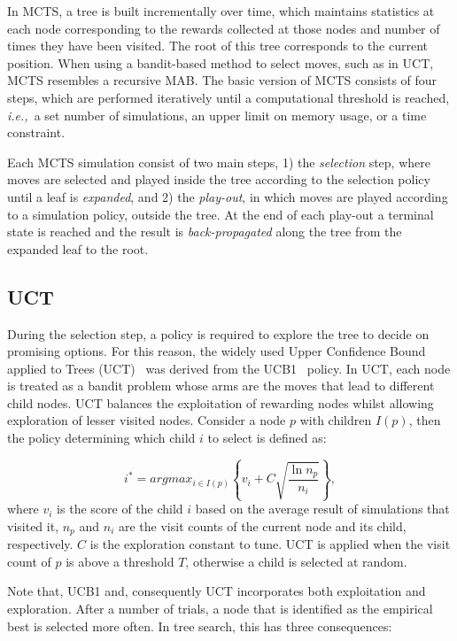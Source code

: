\documentclass[a4paper]{llncs}
\newcommand{\ie}{{\it i.e.,}~}
\begin{document}
In MCTS, a tree is built incrementally over time, which maintains statistics at each node corresponding to the rewards collected at those nodes and number of times they have been visited. The root of this tree corresponds to the current position. 
When using a bandit-based method to select moves, such as in UCT, MCTS resembles a recursive MAB.
The basic version of MCTS consists of four steps, which are performed iteratively until a computational threshold is reached, \ie a set number of simulations, an upper limit on memory usage, or a time constraint. 

Each MCTS simulation consist of two main steps, 1) the \emph{selection} step, where moves are selected and played inside the tree according to the selection policy until a leaf is \emph{expanded}, and 2) the \emph{play-out}, in which moves are played according to a simulation policy, outside the tree. At the end of each play-out a terminal state is reached and the result is \emph{back-propagated} along the tree from the expanded leaf to the root.

\subsection{UCT}
\label{subsec:uct}
During the selection step, a policy is required to explore the tree to decide on promising options. For this reason, the widely used Upper Confidence Bound applied to Trees (UCT)~\cite{kocsis2006bandit} was derived from the UCB1~\cite{auer2002using} policy. In UCT, each node is treated as a bandit problem whose arms are the moves that lead to different child nodes. UCT balances the exploitation of rewarding nodes whilst allowing exploration of lesser visited nodes. Consider a node $p$ with children $I(p)$, then the policy determining which child $i$ to select is defined as:

\begin{equation}
\label{eq:uct}
i^* = argmax_{i \in I(p)}\left\{ v_i + C \sqrt{ \frac{\ln{n_p}}{n_i}}\right\},
\end{equation}
where $v_i$ is the score of the child $i$ based on the average result of simulations that visited it, $n_p$ and $n_i$ are the visit counts of the current node and its child, respectively. $C$ is the exploration constant to tune. UCT is applied when the visit count of $p$ is above a threshold $T$, otherwise a child is selected at random.

Note that, UCB1 and, consequently UCT incorporates both exploitation and exploration. After a number of trials, a node that is identified as the empirical best is selected more often. In tree search, this has three consequences:
\end{document}
